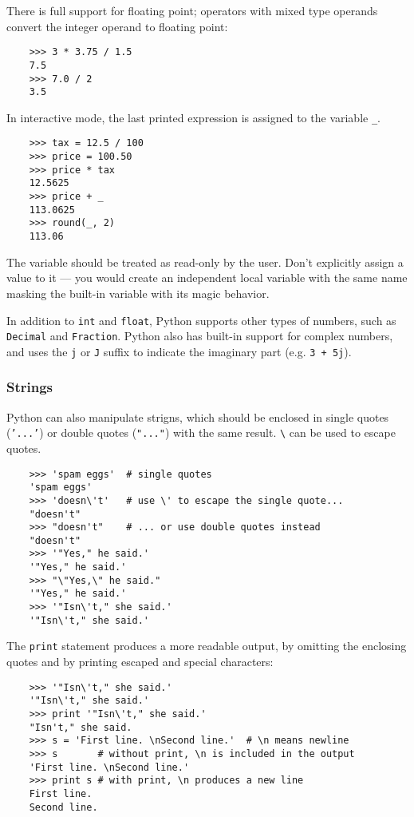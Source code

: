 \documentclass[UTF8]{article}
\begin{document}
There is full support for floating point; operators with mixed type operands convert the integer
operand to floating point:
\begin{verbatim}
    >>> 3 * 3.75 / 1.5
    7.5
    >>> 7.0 / 2
    3.5
\end{verbatim}

In interactive mode, the last printed expression is assigned to the variable \texttt{\_}.
\begin{verbatim}
    >>> tax = 12.5 / 100
    >>> price = 100.50
    >>> price * tax
    12.5625
    >>> price + _
    113.0625
    >>> round(_, 2)
    113.06
\end{verbatim}

The variable should be treated as read-only by the user. Don't explicitly assign a value to it ---
you would create an independent local variable with the same name masking the built-in variable with
its magic behavior.

In addition to \texttt{int} and \texttt{float}, Python supports other types of numbers, such as
\texttt{Decimal} and \texttt{Fraction}. Python also has built-in support for complex numbers, and
uses the \texttt{j} or \texttt{J} suffix to indicate the imaginary part (e.g. \texttt{3 + 5j}).

\subsubsection{Strings}
Python can also manipulate strigns, which should be enclosed in single quotes (\texttt{'...'}) or
double quotes (\texttt{"..."}) with the same result. \texttt{\textbackslash} can be used to escape
quotes.
\begin{verbatim}
    >>> 'spam eggs'  # single quotes
    'spam eggs'
    >>> 'doesn\'t'   # use \' to escape the single quote...
    "doesn't"
    >>> "doesn't"    # ... or use double quotes instead
    "doesn't"
    >>> '"Yes," he said.'
    '"Yes," he said.'
    >>> "\"Yes,\" he said."
    '"Yes," he said.'
    >>> '"Isn\'t," she said.'
    '"Isn\'t," she said.'
\end{verbatim}

The \texttt{print} statement produces a more readable output, by omitting the enclosing quotes and
by printing escaped and special characters:
\begin{verbatim}
    >>> '"Isn\'t," she said.'
    '"Isn\'t," she said.'
    >>> print '"Isn\'t," she said.'
    "Isn't," she said.
    >>> s = 'First line. \nSecond line.'  # \n means newline
    >>> s       # without print, \n is included in the output
    'First line. \nSecond line.'
    >>> print s # with print, \n produces a new line
    First line.
    Second line.
\end{verbatim}
\end{document}
